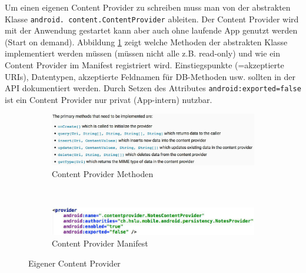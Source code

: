 Um einen eigenen Content Provider zu schreiben muss man von der abstrakten Klasse \texttt{android. \allowbreak content.ContentProvider} ableiten. Der Content Provider wird mit der Anwendung gestartet kann aber auch ohne laufende App genutzt werden (Start on demand). Abbildung \ref{fig:own-content-provider} zeigt welche Methoden der abstrakten Klasse implementiert werden müssen (müssen nicht alle z.B. read-only) und wie ein Content Provider im Manifest registriert wird. Einstiegspunkte (=akzeptierte URIs), Datentypen, akzeptierte Feldnamen für DB-Methoden usw. sollten in der API dokumentiert werden. Durch Setzen des Attributes \texttt{android:exported=false} ist ein Content Provider nur privat (App-intern) nutzbar.

\begin{figure}
	\centering
	\begin{subfigure}[b]{0.48\textwidth}
		\includegraphics[width=\textwidth]{fig/content-provider-methods}
		\caption{Content Provider Methoden}
	\end{subfigure}
	~
	\begin{subfigure}[b]{0.48\textwidth}
		\includegraphics[width=\textwidth]{fig/content-provider-manifest}
		\caption{Content Provider Manifest}
	\end{subfigure}
	\caption{Eigener Content Provider}
	\label{fig:own-content-provider}
\end{figure}
